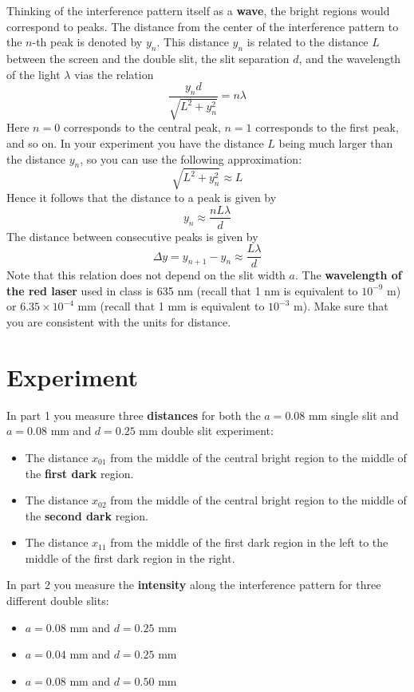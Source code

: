 Thinking of the interference pattern itself as a \textbf{wave}, the bright regions would correspond to peaks. The distance from the center of the interference pattern to the $n$-th peak is denoted by $y_{n}$. This distance $y_{n}$ is related to the distance $L$ between the screen and the double slit, the slit separation $d$, and the wavelength of the light $\lambda$ vias the relation
\begin{equation}
	\frac{y_{n} d}{\sqrt{L^{2} + y_{n}^{2}}} = n \lambda
\end{equation}
Here $n = 0$ corresponds to the central peak, $n = 1$ corresponds to the first peak, and so on. In your experiment you have the distance $L$ being much larger than the distance $y_{n}$, so you can use the following approximation:
\begin{equation}
	\sqrt{L^{2} + y_{n}^{2}} \approx L
\end{equation}
Hence it follows that the distance to a peak is given by
\begin{equation}
	y_{n} \approx \frac{n L \lambda}{d}
\end{equation}
The distance between consecutive peaks is given by
\begin{equation}
	\Delta y = y_{n+1} - y_{n} \approx \frac{L \lambda}{d}
	\label{eq.10.y}
\end{equation}
Note that this relation does not depend on the slit width $a$. The \textbf{wavelength of the red laser} used in class is 635 nm (recall that 1 nm is equivalent to $10^{-9}$ m) or $6.35 \times 10^{-4}$ mm (recall that 1 mm is equivalent to $10^{-3}$ m). Make sure that you are consistent with the units for distance.
%
\section{Experiment}
%
In part 1 you measure three \textbf{distances} for both the $a = 0.08$ mm single slit and $a = 0.08$ mm and $d = 0.25$ mm double slit experiment:
\begin{itemize}
	\item The distance $x_{01}$ from the middle of the central bright region to the middle of the \textbf{first dark} region.
	\item The distance $x_{02}$ from the middle of the central bright region to the middle of the \textbf{second dark} region.
	\item The distance $x_{11}$ from the middle of the first dark region in the left to the middle of the first dark region in the right.
\end{itemize}
In part 2 you measure the \textbf{intensity} along the interference pattern for three different double slits:
\begin{itemize}
	\item $a = 0.08$ mm and $d = 0.25$ mm
	\item $a = 0.04$ mm and $d = 0.25$ mm
	\item $a = 0.08$ mm and $d = 0.50$ mm
\end{itemize}
%
